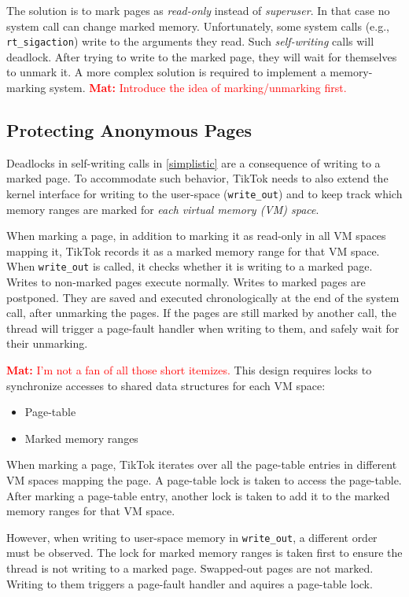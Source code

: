 \documentclass[conference]{IEEEtran}
\newcommand{\mat}[1]{\textcolor{red}{\textbf{Mat:} #1}}
\newcommand{\sysname}{TikTok}
\begin{document}
The solution is to mark pages as \emph{read-only} instead of \emph{superuser}.
In that case no system call can change marked memory. Unfortunately,
some system calls (e.g., \texttt{rt\_sigaction}) write to the arguments they
read. Such \emph{self-writing} calls will deadlock. After trying to write to the
marked page, they will wait for themselves to unmark it. A more complex solution
is required to implement a memory-marking system.
\mat{Introduce the idea of marking/unmarking first.}


\subsection{Protecting Anonymous Pages}
\label{subsec:complex}

Deadlocks in self-writing calls in \autoref{simplistic} are a consequence of
writing to a marked page. To accommodate such behavior, \sysname{} needs to also
extend the kernel interface for writing to the user-space (\texttt{write\_out})
and to keep track which memory ranges are marked for \emph{each virtual memory
(VM) space}.

When marking a page, in addition to marking it as read-only in all VM spaces
mapping it, \sysname{} records it as a marked memory range for that VM space.
When \texttt{write\_out} is called, it checks whether it is writing to a marked
page. Writes to non-marked pages execute normally. Writes to marked pages are
postponed. They are saved and executed chronologically at the end of the system
call, after unmarking the pages. If the pages are still marked by another call,
the thread will trigger a page-fault handler when writing to them, and safely
wait for their unmarking.

\mat{I'm not a fan of all those short itemizes.}
This design requires locks to synchronize accesses to shared data structures for
each VM space:
\begin{itemize}
  \item Page-table
  \item Marked memory ranges
\end{itemize}

When marking a page, \sysname{} iterates over all the page-table entries in
different VM spaces mapping the page. A page-table lock is taken to access the
page-table. After marking a page-table entry, another lock is taken to add it to
the marked memory ranges for that VM space.

However, when writing to user-space memory in \texttt{write\_out}, a different
order must be observed. The lock for marked memory ranges is taken first to
ensure the thread is not writing to a marked page. Swapped-out pages are not
marked. Writing to them triggers a page-fault handler and aquires a page-table
lock.
\end{document}

